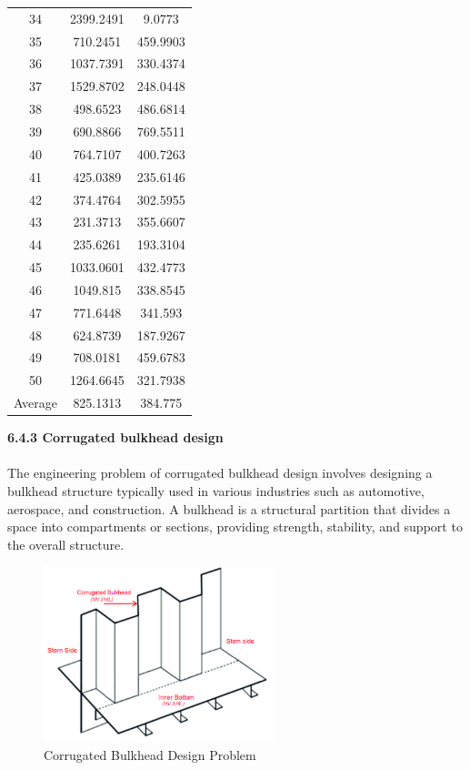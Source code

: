 \documentclass[
]{article}
\begin{document}
\begin{justify}
{\begin{table}[htbp]
\begin{tabular}{ccc}
34 &  2399.2491 & 9.0773 \\
35 &  710.2451 & 459.9903 \\
36 &  1037.7391 & 330.4374 \\
37 &  1529.8702 & 248.0448 \\
38 &  498.6523 & 486.6814 \\
39 &  690.8866 & 769.5511 \\
40 &  764.7107 & 400.7263 \\
41 &  425.0389 & 235.6146 \\
42 &  374.4764 & 302.5955 \\
43 &  231.3713 & 355.6607 \\
44 &  235.6261 & 193.3104 \\
45 &  1033.0601 & 432.4773 \\
46 &  1049.815 & 338.8545 \\
47 &  771.6448 & 341.593 \\
48 &  624.8739 & 187.9267 \\
49 &  708.0181 & 459.6783 \\
50 &  1264.6645 & 321.7938 \\
\midrule
Average & 825.1313 & 384.775 \\
\bottomrule
\end{tabular}
\end{table}

\newpage
\def\labelenumi{\arabic{enumi}.}
\item
\vspace{5mm}
\textbf{6.4.3 Corrugated bulkhead design}\\\\
The engineering problem of corrugated bulkhead design involves designing a bulkhead structure typically used in various industries such as automotive, aerospace, and construction. A bulkhead is a structural partition that divides a space into compartments or sections, providing strength, stability, and support to the overall structure.

\begin{figure}[htbp]
    \centering
    \includegraphics[width=0.6\textwidth]{bulkhead.png}
    \caption{Corrugated Bulkhead Design Problem}
    \label{fig:bulkhead}
\end{figure}

}
\end{justify}
\end{document}
